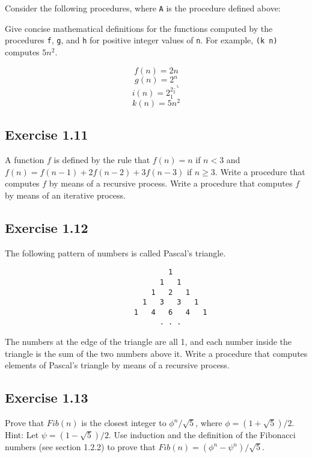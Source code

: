 \documentclass[letterpaper, leqno]{article}
\begin{document}


Consider the following procedures, where \texttt{A} is the procedure defined above:



Give concise mathematical definitions for the functions computed by the procedures \texttt{f}, \texttt{g}, and \texttt{h} for positive integer values of \texttt{n}. For example, \texttt{(k n)} computes $5n^2$. 

\textcolor{answer}{$$f(n) = 2n$$}
\textcolor{answer}{$$g(n) = 2^n$$}
\textcolor{answer}{$$i(n) = 2_1^{2_2^{...^{2_n}}}$$}
\textcolor{answer}{$$k(n) = 5n^2$$}

\subsection*{Exercise 1.11}
 A function $f$ is defined by the rule that $f(n) = n$ if $n<3$ and $f(n) = f(n - 1) + 2f(n - 2) + 3f(n - 3)$ if $n \geq 3$. Write a procedure that computes $f$ by means of a recursive process. Write a procedure that computes $f$ by means of an iterative process.



\subsection*{Exercise 1.12}
The following pattern of numbers is called Pascal's triangle.

\begin{verbatim}
                                      1
                                    1   1
                                  1   2   1
                                1   3   3   1
                              1   4   6   4   1
                                    . . .
\end{verbatim}

The numbers at the edge of the triangle are all 1, and each number inside the triangle is the sum of the two numbers above it. Write a procedure that computes elements of Pascal's triangle by means of a recursive process. 



\subsection*{Exercise 1.13}
Prove that $Fib(n)$ is the closest integer to $\phi^n/\sqrt{5}$, where $\phi = (1+\sqrt{5})/2$. Hint: Let $\psi = (1-\sqrt{5})/2$. Use induction and the definition of the Fibonacci numbers (see section 1.2.2) to prove that $Fib(n) = (\phi^n - \psi^n)/\sqrt{5}$. 
\end{document}
